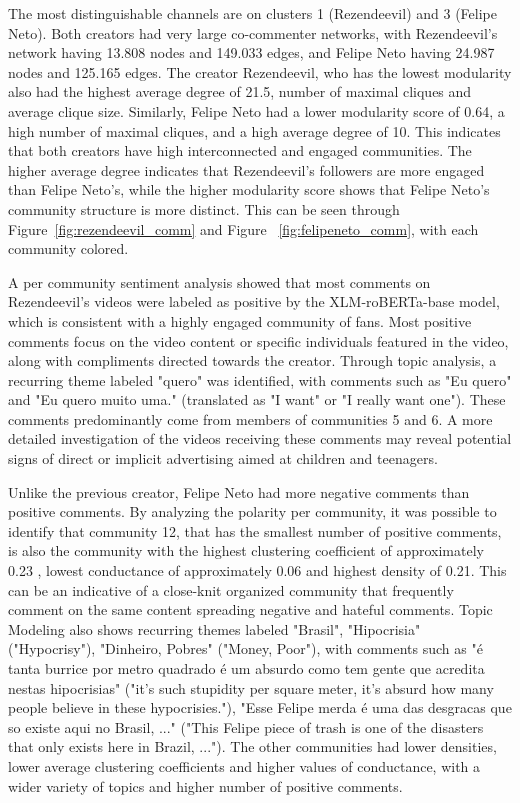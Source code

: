 \documentclass[12pt]{article}
\begin{document}
The most distinguishable channels are on clusters 1 (Rezendeevil) and 3 (Felipe Neto). 
Both creators had very large co-commenter networks, with Rezendeevil's network having 13.808 
nodes and 149.033 edges, and Felipe Neto having 24.987 nodes and 125.165 edges.
The creator Rezendeevil, who has the lowest modularity also had the highest 
average degree of 21.5, number of maximal cliques and average clique size.
Similarly, Felipe Neto had a lower modularity score of 0.64, a high number of maximal cliques,
and a high average degree of 10.
This indicates that both creators have high interconnected and engaged communities. The higher average
degree indicates that Rezendeevil's followers are more engaged than Felipe Neto's, while the higher
modularity score shows that Felipe Neto's community structure is more distinct.
This can be seen through Figure~\ref{fig:rezendeevil_comm} and Figure ~\ref{fig:felipeneto_comm}, 
with each community colored.

A per community sentiment analysis showed that most comments on Rezendeevil's videos were labeled as 
positive by the XLM-roBERTa-base model, which is consistent with a highly engaged community of fans.
Most positive comments focus on the video content or specific individuals featured in the video, 
along with compliments directed towards the creator. Through topic analysis, a recurring theme labeled 
"quero" was identified, with comments such as "Eu quero" and "Eu quero muito uma." 
(translated as "I want" or "I really want one").
These comments predominantly come from members of communities 5 and 6. A more detailed investigation 
of the videos receiving these comments may reveal potential signs of direct or implicit advertising 
aimed at children and teenagers.

Unlike the previous creator, Felipe Neto had more negative comments than positive comments. 
By analyzing the polarity per community, it was possible to identify that community 12, 
that has the smallest number of positive comments, is also the community with the highest clustering 
coefficient of approximately 0.23 , lowest conductance of approximately 0.06 and highest density 
of 0.21. This can be an indicative of a close-knit organized community that frequently comment on the 
same content spreading negative and hateful comments. 
Topic Modeling also shows recurring themes labeled "Brasil", "Hipocrisia" 
("Hypocrisy"), "Dinheiro, Pobres" ("Money, Poor"), with comments such as 
"é tanta burrice por metro quadrado é um absurdo como tem gente que acredita nestas hipocrisias" 
("it's such stupidity per square meter, it's absurd how many people believe in these hypocrisies."),
"Esse Felipe merda é uma das desgracas que so existe aqui no Brasil, ..." 
("This Felipe piece of trash is one of the disasters that only exists here in Brazil, ..."). 
The other communities had lower densities, lower average clustering coefficients and higher values 
of conductance, with a wider variety of topics and higher number of positive comments. 
\end{document}
